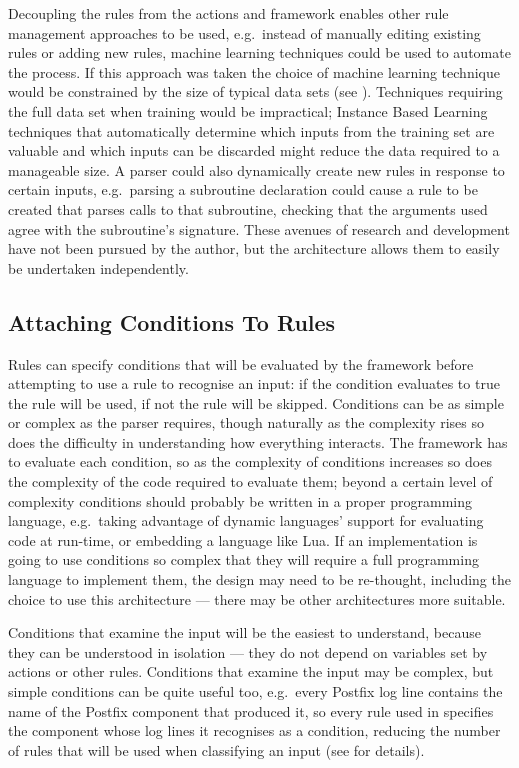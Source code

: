 Decoupling the rules from the actions and framework enables other rule
management approaches to be used, e.g.\ instead of manually editing
existing rules or adding new rules, machine learning techniques could be
used to automate the process.  If this approach was taken the choice of
machine learning technique would be constrained by the size of typical data
sets (see ).  Techniques requiring the full
data set when training would be impractical; Instance Based
Learning~\cite{instance-based-learning} techniques that automatically
determine which inputs from the training set are valuable and which inputs
can be discarded might reduce the data required to a manageable size.  A
parser could also dynamically create new rules in response to certain
inputs, e.g.\ parsing a subroutine declaration could cause a rule to be
created that parses calls to that subroutine, checking that the arguments
used agree with the subroutine's signature.  These avenues of research and
development have not been pursued by the author, but the architecture
allows them to easily be undertaken independently.

\subsection{Attaching Conditions To Rules}

\label{attaching conditions to rules}

Rules can specify conditions that will be evaluated by the framework before
attempting to use a rule to recognise an input: if the condition evaluates
to true the rule will be used, if not the rule will be skipped.  Conditions
can be as simple or complex as the parser requires, though naturally as the
complexity rises so does the difficulty in understanding how everything
interacts.  The framework has to evaluate each condition, so as the
complexity of conditions increases so does the complexity of the code
required to evaluate them; beyond a certain level of complexity conditions
should probably be written in a proper programming language, e.g.\ taking
advantage of dynamic languages' support for evaluating code at run-time, or
embedding a language like Lua.  If an implementation is going to use
conditions so complex that they will require a full programming language to
implement them, the design may need to be re-thought, including the choice
to use this architecture --- there may be other architectures more
suitable.

Conditions that examine the input will be the easiest to understand,
because they can be understood in isolation --- they do not depend on
variables set by actions or other rules.  Conditions that examine the input
may be complex, but simple conditions can be quite useful too, e.g.\ every
Postfix log \empty{}line contains the name of the Postfix component that
produced it, so every rule used in \parsername{} specifies the component
whose log \empty{}lines it recognises as a condition, reducing the number
of rules that will be used when classifying an input (see  for details).

